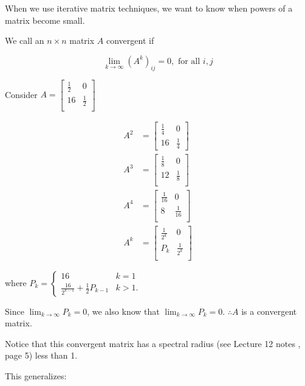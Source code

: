 When we use iterative matrix techniques, we want to know when powers of a 
matrix become small.

 We call an $n \times n$ matrix $A$ convergent if 

\begin{equation*}
  \lim_{k\to\infty} \left(A^k\right)_{ij} = 0, \text{ for all } i,j
\end{equation*}

\ex Consider $A=\begin{bmatrix}
\frac{1}{2} & 0\\
16 & \frac{1}{2}\\
\end{bmatrix}$

\begin{align*}
  A^2 &= 
  \begin{bmatrix}
    \frac{1}{4} & 0 \\
    16 & \frac{1}{4}
  \end{bmatrix} \\
  A^3 &= 
  \begin{bmatrix}
    \frac{1}{8} & 0\\
    12 & \frac{1}{8}\\
  \end{bmatrix}\\
  A^4 &= 
  \begin{bmatrix}
    \frac{1}{16} & 0\\
    8 & \frac{1}{16}\\
  \end{bmatrix} \\
  A^k &= 
  \begin{bmatrix}
    \frac{1}{2^k} & 0\\
    P_k & \frac{1}{2^k}\\
  \end{bmatrix}
\end{align*}

where $P_k = \begin{cases}
16 & k=1\\
\frac{16}{2^{k-1}} + \frac{1}{2}P_{k-1} & k>1
.\end{cases}$

Since $\lim_{k\to\infty} P_k = 0$, we also know that $\lim_{k\to\infty} P_k = 0$.
$\therefore A$ is a convergent matrix.

Notice that this convergent matrix has a spectral radius (see Lecture 12 notes
, page 5) less than 1.

This generalizes:
\pagebreak

